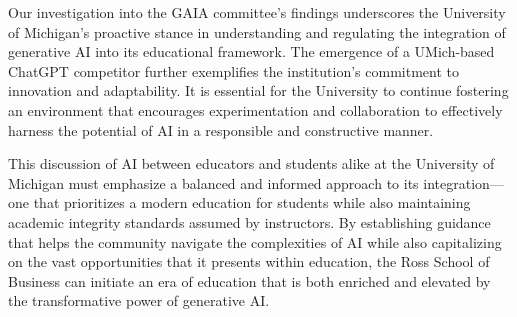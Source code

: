 \documentclass[
]{book}
\begin{document}
Our investigation into the GAIA committee's findings underscores the University of Michigan's proactive stance in understanding and regulating the integration of generative AI into its educational framework. The emergence of a UMich-based ChatGPT competitor further exemplifies the institution's commitment to innovation and adaptability. It is essential for the University to continue fostering an environment that encourages experimentation and collaboration to effectively harness the potential of AI in a responsible and constructive manner.

This discussion of AI between educators and students alike at the University of Michigan must emphasize a balanced and informed approach to its integration---one that prioritizes a modern education for students while also maintaining academic integrity standards assumed by instructors. By establishing guidance that helps the community navigate the complexities of AI while also capitalizing on the vast opportunities that it presents within education, the Ross School of Business can initiate an era of education that is both enriched and elevated by the transformative power of generative AI.

\hfill\break
\end{document}
